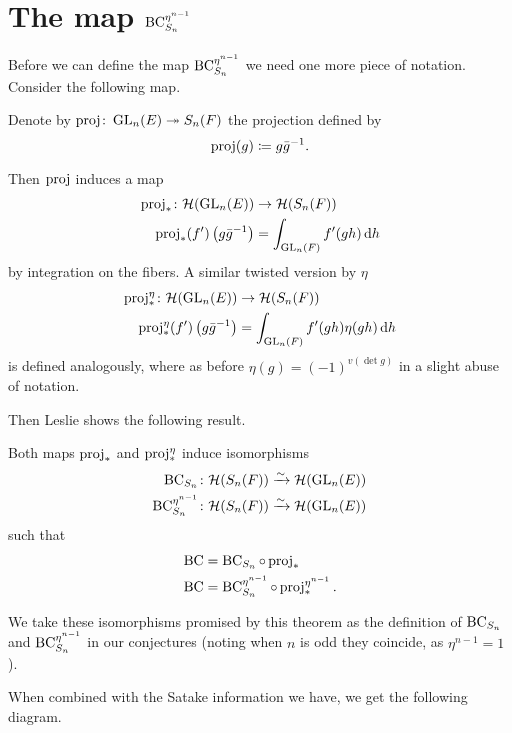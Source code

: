 \section{The map $\operatorname{BC}^{\eta^{n-1}}_{S_n}$}
Before we can define the map $\operatorname{BC}^{\eta^{n-1}}_{S_n}$
we need one more piece of notation.
Consider the following map.
\begin{definition}
  [$\rproj$]
  Denote by $\operatorname{proj} \colon \operatorname{GL}_n(E) \twoheadrightarrow S_n(F)$ the projection defined by
  \[ \operatorname{proj}(g) \coloneqq g \bar{g}^{-1}. \]
\end{definition}
Then $\rproj$ induces a map
\begin{align*}
  \rproj_\ast \colon \HH(\GL_n(E)) &\to \HH(S_n(F)) \\
  \rproj_\ast(f')\left( g\bar{g}\inv \right) &= \int_{\GL_n(F)} f'(gh) \odif h
\end{align*}
by integration on the fibers.
A similar twisted version by $\eta$
\begin{align*}
  \rproj_\ast^\eta \colon \HH(\GL_n(E)) &\to \HH(S_n(F)) \\
  \rproj_\ast^\eta(f')\left( g\bar{g}\inv \right) &= \int_{\GL_n(F)} f'(gh) \eta(gh) \odif h
\end{align*}
is defined analogously,
where as before $\eta(g) = (-1)^{v(\det g)}$ in a slight abuse of notation.

Then Leslie \cite{ref:leslie} shows the following result.
\begin{theorem}
  Both maps $\operatorname{proj}_\ast$ and $\operatorname{proj}_\ast^\eta$ induce isomorphisms
  \begin{align*}
    \operatorname{BC}_{S_n} \colon \mathcal H(S_n(F)) &\xrightarrow{\sim} \mathcal H(\operatorname{GL}_n(E)) \\
    \operatorname{BC}^{\eta^{n-1}}_{S_n} \colon \mathcal H(S_n(F)) &\xrightarrow{\sim} \mathcal H(\operatorname{GL}_n(E))
  \end{align*}
  such that
  \begin{align*}
    \operatorname{BC} &= \operatorname{BC}_{S_n} \circ \operatorname{proj}_\ast \\
    \operatorname{BC} &= \operatorname{BC}^{\eta^{n-1}}_{S_n} \circ \operatorname{proj}_\ast^{\eta^{n-1}}.
  \end{align*}
\end{theorem}
We take these isomorphisms promised by this theorem
as the definition of $\operatorname{BC}_{S_n}$ and $\operatorname{BC}^{\eta^{n-1}}_{S_n}$ in our conjectures
(noting when $n$ is odd they coincide, as $\eta^{n-1} = 1$).

When combined with the Satake information we have, we get the following diagram.
\begin{center}
\end{center}

